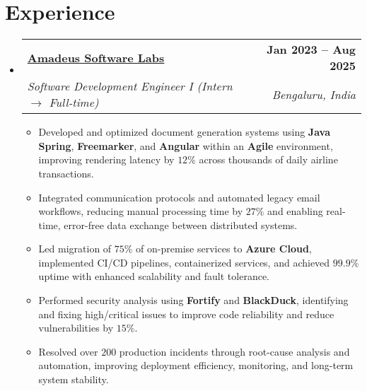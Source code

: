 \documentclass[letterpaper,11pt]{article}
\makeatletter
\newcommand{\resumeItem}[1]{
  \item\small{
    {#1 \vspace{-2pt}}
  }
}
\newcommand{\resumeSubheading}[4]{
  \vspace{-2pt}\item
    \begin{tabular*}{1.0\textwidth}[t]{l@{\extracolsep{\fill}}r}
      \textbf{#1} & \textbf{\small #2} \\
      \textit{\small#3} & \textit{\small #4} \\
    \end{tabular*}\vspace{-7pt}
}
\newcommand{\resumeSubHeadingListStart}{\begin{itemize}[leftmargin=0.0in, label={}]}
\newcommand{\resumeSubHeadingListEnd}{\end{itemize}}
\newcommand{\resumeItemListStart}{\begin{itemize}}
\newcommand{\resumeItemListEnd}{\end{itemize}\vspace{-5pt}}
\makeatother
\begin{document}


\section{Experience}
  \resumeSubHeadingListStart
    \resumeSubheading
      {\href{https://amadeus.com/en}{Amadeus Software Labs}}{Jan 2023 -- Aug 2025}
      {Software Development Engineer I (Intern $\rightarrow$ Full-time)}{Bengaluru, India}
      \resumeItemListStart
        \resumeItem{Developed and optimized document generation systems using \textbf{Java Spring}, \textbf{Freemarker}, and \textbf{Angular} within an \textbf{Agile} environment, improving rendering latency by $12\%$ across thousands of daily airline transactions.}
        \resumeItem{Integrated communication protocols and automated legacy email workflows, reducing manual processing time by $27\%$ and enabling real-time, error-free data exchange between distributed systems.}
        \resumeItem{Led migration of $75\%$ of on-premise services to \textbf{Azure Cloud}, implemented CI/CD pipelines, containerized services, and achieved $99.9\%$ uptime with enhanced scalability and fault tolerance.}
        \resumeItem{Performed security analysis using \textbf{Fortify} and \textbf{BlackDuck}, identifying and fixing high/critical issues to improve code reliability and reduce vulnerabilities by $15\%$.}
        \resumeItem{Resolved over $200$ production incidents through root-cause analysis and automation, improving deployment efficiency, monitoring, and long-term system stability.}
      \resumeItemListEnd
  \resumeSubHeadingListEnd
\end{document}

